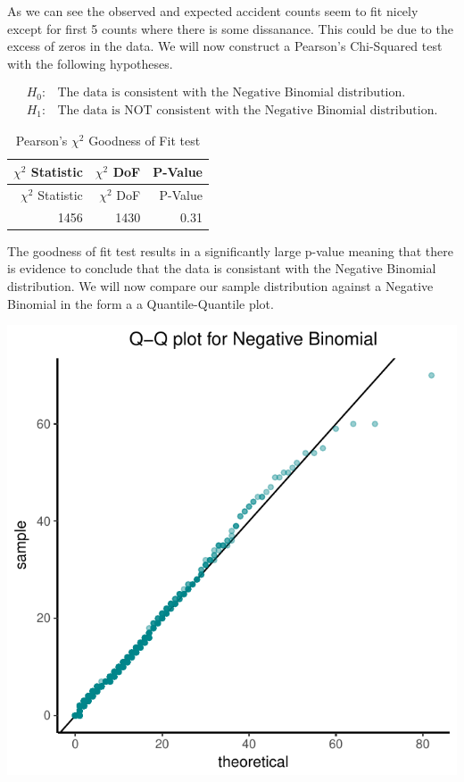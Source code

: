\documentclass[11pt,preprint, authoryear]{elsarticle}
\numberwithin{equation}{section}
\numberwithin{figure}{section}
\numberwithin{table}{section}
\begin{document}
As we can see the observed and expected accident counts seem to fit
nicely except for first 5 counts where there is some dissanance. This
could be due to the excess of zeros in the data. We will now construct a
Pearson's Chi-Squared test with the following hypotheses.

\begin{align*}
H_0: & \text{The data is consistent with the Negative Binomial distribution.}\\
H_1: & \text{The data is NOT consistent with the Negative Binomial distribution.} 
\end{align*}

\begin{longtable}[]{@{}rrr@{}}
\caption{Pearson's \(\chi^2\) Goodness of Fit test}\tabularnewline
\toprule
\(\chi^2\) Statistic & \(\chi^2\) DoF & P-Value\tabularnewline
\midrule
\endfirsthead
\toprule
\(\chi^2\) Statistic & \(\chi^2\) DoF & P-Value\tabularnewline
\midrule
\endhead
1456 & 1430 & 0.31\tabularnewline
\bottomrule
\end{longtable}

The goodness of fit test results in a significantly large p-value
meaning that there is evidence to conclude that the data is consistant
with the Negative Binomial distribution. We will now compare our sample
distribution against a Negative Binomial in the form a a
Quantile-Quantile plot.

\includegraphics{likelihood_files/figure-latex/qq_plot-1.pdf}
\end{document}
